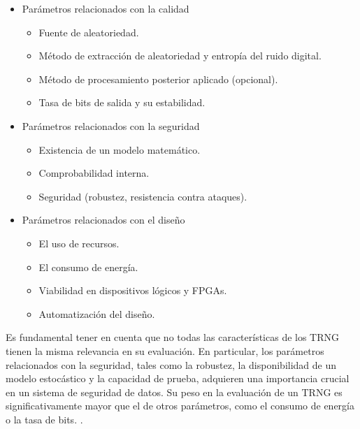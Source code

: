         \begin{itemize}[noitemsep]
            \item Parámetros relacionados con la calidad
                \begin{itemize}[noitemsep]
                    \item Fuente de aleatoriedad.
                    \item Método de extracción de aleatoriedad y entropía del ruido digital.
                    \item Método de procesamiento posterior aplicado (opcional).
                    \item Tasa de bits de salida y su estabilidad.
                \end{itemize}
            \item Parámetros relacionados con la seguridad
                \begin{itemize}[noitemsep]
                    \item Existencia de un modelo matemático.
                    \item Comprobabilidad interna.
                    \item Seguridad (robustez, resistencia contra ataques).
                \end{itemize}
            \item Parámetros relacionados con el diseño
                \begin{itemize}[noitemsep]
                    \item El uso de recursos.
                    \item El consumo de energía.
                    \item Viabilidad en dispositivos lógicos y FPGAs.
                    \item Automatización del diseño.
                \end{itemize}
        \end{itemize}

        Es fundamental tener en cuenta que no todas las características de los TRNG tienen la misma relevancia en su evaluación. En particular, los parámetros relacionados con la seguridad, tales como la robustez, la disponibilidad de un modelo estocástico y la capacidad de prueba, adquieren una importancia crucial en un sistema de seguridad de datos. Su peso en la evaluación de un TRNG es significativamente mayor que el de otros parámetros, como el consumo de energía o la tasa de bits. \cite{Badrignans2011}.

